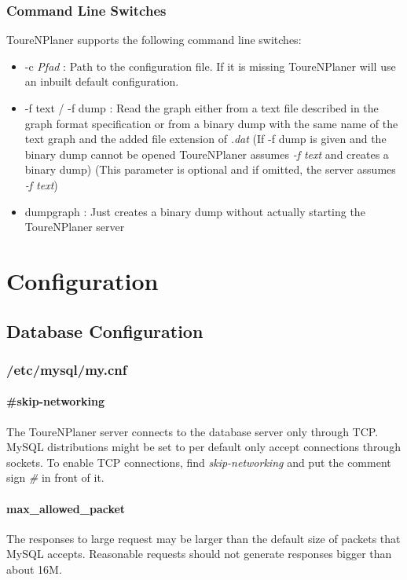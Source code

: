 \documentclass[ngerman,titlepage,parskip=true]{scrartcl}
\begin{document}
	\subsubsection{Command Line Switches}
	ToureNPlaner supports the following command line switches:
	\begin{itemize}
	  \item -c \textit{Pfad} : Path to the configuration file. If it is missing ToureNPlaner will use an inbuilt default configuration.
	  \item -f text / -f dump : Read the graph either from a text file described in the graph format specification or from a binary dump with the same name of the text graph and the added file extension of \textit{.dat} (If -f dump is given and the binary dump cannot be opened ToureNPlaner assumes \textit{-f text} and creates a binary dump) (This parameter is optional and if omitted, the server assumes \textit{-f text})
	 \item dumpgraph : Just creates a binary dump without actually starting the ToureNPlaner server
	\end{itemize}

\section{Configuration}
\subsection{Database Configuration}
\subsubsection{/etc/mysql/my.cnf}
	 \paragraph{\#skip-networking}
	 The ToureNPlaner server connects to the database server only through TCP. MySQL distributions might be set to per default only accept connections through sockets.
	 To enable TCP connections, find \textit{skip-networking} and put the comment sign \textit{\#} in front of it.
	 \paragraph{max\_allowed\_packet}
	 The responses to large request may be larger than the default size of packets that MySQL accepts. Reasonable requests should not generate responses bigger than about 16M.
\end{document}
